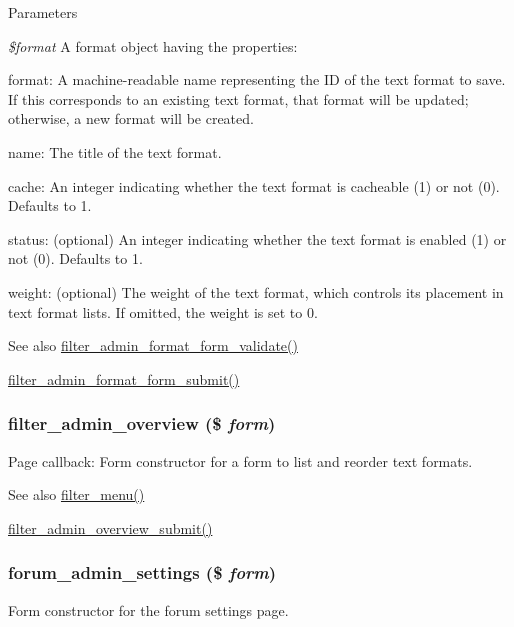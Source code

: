 \begin{DoxyParams}{Parameters}
\item[{\em \$format}]A format object having the properties:
\begin{DoxyItemize}
\item format: A machine-\/readable name representing the ID of the text format to save. If this corresponds to an existing text format, that format will be updated; otherwise, a new format will be created.
\item name: The title of the text format.
\item cache: An integer indicating whether the text format is cacheable (1) or not (0). Defaults to 1.
\item status: (optional) An integer indicating whether the text format is enabled (1) or not (0). Defaults to 1.
\item weight: (optional) The weight of the text format, which controls its placement in text format lists. If omitted, the weight is set to 0.
\end{DoxyItemize}\end{DoxyParams}
\begin{DoxySeeAlso}{See also}
\hyperlink{filter_8admin_8inc_a1ae5e99340abc69aadeff9d2a538d578}{filter\_\-admin\_\-format\_\-form\_\-validate()} 

\hyperlink{filter_8admin_8inc_a1cabbcac9ccc4de52ea16a64a8c8cd54}{filter\_\-admin\_\-format\_\-form\_\-submit()} 
\end{DoxySeeAlso}
\hypertarget{group__forms_ga3fc30971380683ced638edbd19d1390c}{
\subsubsection[{filter\_\-admin\_\-overview}]{\setlength{\rightskip}{0pt plus 5cm}filter\_\-admin\_\-overview (\$ {\em form})}}
\label{group__forms_ga3fc30971380683ced638edbd19d1390c}
Page callback: Form constructor for a form to list and reorder text formats.

\begin{DoxySeeAlso}{See also}
\hyperlink{filter_8module_a13c5612763d7d98499832594ac3d5466}{filter\_\-menu()} 

\hyperlink{filter_8admin_8inc_a60b5bbf55b2f0678c64ae17f613d03d0}{filter\_\-admin\_\-overview\_\-submit()} 
\end{DoxySeeAlso}
\hypertarget{group__forms_ga1e08f493fe043879a93e783b05cfb870}{
\subsubsection[{forum\_\-admin\_\-settings}]{\setlength{\rightskip}{0pt plus 5cm}forum\_\-admin\_\-settings (\$ {\em form})}}
\label{group__forms_ga1e08f493fe043879a93e783b05cfb870}
Form constructor for the forum settings page.

